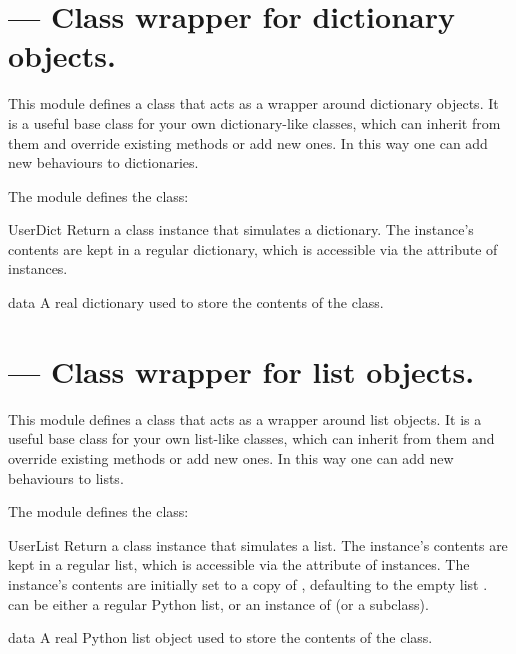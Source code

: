\section{ ---
         Class wrapper for dictionary objects.}



This module defines a class that acts as a wrapper around
dictionary objects.  It is a useful base class for
your own dictionary-like classes, which can inherit from
them and override existing methods or add new ones.  In this way one
can add new behaviours to dictionaries.

The  module defines the  class:

\begin{classdesc}{UserDict}{}
Return a class instance that simulates a dictionary.  The instance's
contents are kept in a regular dictionary, which is accessible via the
 attribute of  instances.
\end{classdesc}

\begin{memberdesc}{data}
A real dictionary used to store the contents of the 
class.
\end{memberdesc}


\section{ ---
         Class wrapper for list objects.}



This module defines a class that acts as a wrapper around
list objects.  It is a useful base class for
your own list-like classes, which can inherit from
them and override existing methods or add new ones.  In this way one
can add new behaviours to lists.

The  module defines the  class:

\begin{classdesc}{UserList}{}
Return a class instance that simulates a list.  The instance's
contents are kept in a regular list, which is accessible via the
 attribute of  instances.  The instance's
contents are initially set to a copy of , defaulting to the
empty list \code{[]}.   can be either a regular Python list,
or an instance of  (or a subclass).
\end{classdesc}

\begin{memberdesc}{data}
A real Python list object used to store the contents of the
 class.
\end{memberdesc}
